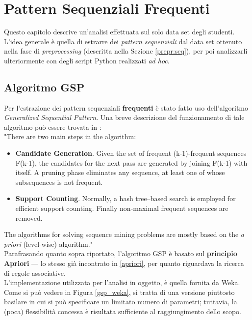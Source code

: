 \chapter{Pattern Sequenziali Frequenti}
\label{ch:seq}

Questo capitolo descrive un'analisi effettuata sul solo data set degli studenti. L'idea generale è quella di estrarre dei \textit{pattern sequenziali} dal data set ottenuto nella fase di \textit{preprocessing} (descritta nella Sezione \ref{prepr:seq}), per poi analizzarli ulteriormente con degli script Python realizzati \textit{ad hoc}.

\section{Algoritmo GSP}

    Per l'estrazione dei pattern sequenziali \textbf{frequenti} è stato fatto uso dell'algoritmo \textit{Generalized Sequential Pattern}. Una breve descrizione del funzionamento di tale algoritmo può essere trovata in \cite{gsp}: \\

    "There are two main steps in the algorithm:
    \begin{itemize}
        \item \textbf{Candidate Generation}. Given the set of frequent (k-1)-frequent sequences F(k-1), the candidates for the next pass are generated by joining F(k-1) with itself. A pruning phase eliminates any sequence, at least one of whose subsequences is not frequent.
        \item \textbf{Support Counting}. Normally, a hash tree–based search is employed for efficient support counting. Finally non-maximal frequent sequences are removed.
    \end{itemize}

    The algorithms for solving sequence mining problems are mostly based on the \textit{a priori} (level-wise) algorithm." \\

    Parafrasando quanto sopra riportato, l'algoritmo GSP è basato sul \textbf{principio Apriori} --- lo stesso già incontrato in \ref{apriori}, per quanto riguardava la ricerca di regole associative. \\

    L'implementazione utilizzata per l'analisi in oggetto, è quella fornita da Weka. Come si può vedere in Figura \ref{gsp_weka}, si tratta di una versione piuttosto basilare in cui si può specificare un limitato numero di parametri; tuttavia, la (poca) flessibilità concessa è risultata sufficiente al raggiungimento dello scopo.

